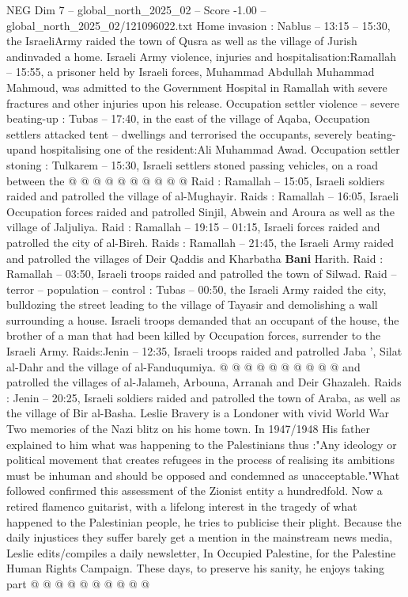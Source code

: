 \begin{textsample}{NEG Dim 7 – global\_north\_2025\_02 – Score -1.00 – global\_north\_2025\_02/121096022.txt}
Home invasion : Nablus -- 13:15 -- 15:30, the IsraeliArmy raided the town of Qusra as well as the village of Jurish andinvaded a home.
Israeli Army violence, injuries and hospitalisation:Ramallah -- 15:55, a prisoner held by Israeli forces, Muhammad Abdullah Muhammad Mahmoud, was admitted to the Government Hospital in Ramallah with severe fractures and other injuries upon his release.
Occupation settler violence -- severe beating-up : Tubas -- 17:40, in the east of the village of Aqaba, Occupation settlers attacked tent -- dwellings and terrorised the occupants, severely beating-upand hospitalising one of the resident:Ali Muhammad Awad.
Occupation settler stoning : Tulkarem -- 15:30, Israeli settlers stoned passing vehicles, on a road between the @ @ @ @ @ @ @ @ @ @ Raid : Ramallah -- 15:05, Israeli soldiers raided and patrolled the village of al-Mughayir.
Raids : Ramallah -- 16:05, Israeli Occupation forces raided and patrolled Sinjil, Abwein and Aroura as well as the village of Jaljuliya.
Raid : Ramallah -- 19:15 -- 01:15, Israeli forces raided and patrolled the city of al-Bireh.
Raids : Ramallah -- 21:45, the Israeli Army raided and patrolled the villages of Deir Qaddis and Kharbatha \textbf{Bani} Harith.
Raid : Ramallah -- 03:50, Israeli troops raided and patrolled the town of Silwad.
Raid -- terror -- population -- control : Tubas -- 00:50, the Israeli Army raided the city, bulldozing the street leading to the village of Tayasir and demolishing a wall surrounding a house.
Israeli troops demanded that an occupant of the house, the brother of a man that had been killed by Occupation forces, surrender to the Israeli Army.
Raids:Jenin -- 12:35, Israeli troops raided and patrolled Jaba ', Silat al-Dahr and the village of al-Fanduqumiya. @ @ @ @ @ @ @ @ @ @ and patrolled the villages of al-Jalameh, Arbouna, Arranah and Deir Ghazaleh.
Raids : Jenin -- 20:25, Israeli soldiers raided and patrolled the town of Araba, as well as the village of Bir al-Basha.
Leslie Bravery is a Londoner with vivid World War Two memories of the Nazi blitz on his home town.
In 1947/1948 His father explained to him what was happening to the Palestinians thus :"Any ideology or political movement that creates refugees in the process of realising its ambitions must be inhuman and should be opposed and condemned as unacceptable."What followed confirmed this assessment of the Zionist entity a hundredfold.
Now a retired flamenco guitarist, with a lifelong interest in the tragedy of what happened to the Palestinian people, he tries to publicise their plight.
Because the daily injustices they suffer barely get a mention in the mainstream news media, Leslie edits/compiles a daily newsletter, In Occupied Palestine, for the Palestine Human Rights Campaign.
These days, to preserve his sanity, he enjoys taking part @ @ @ @ @ @ @ @ @ @

\end{textsample}

